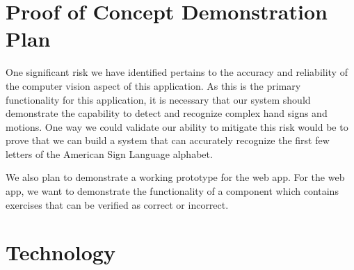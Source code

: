\documentclass{article}
\begin{document}
\section{Proof of Concept Demonstration Plan}

One significant risk we have identified pertains to the accuracy and reliability of the computer vision aspect of this application. As this is the primary functionality for this application, it is necessary that our system should demonstrate the capability to detect and recognize complex hand signs and motions. One way we could validate our ability to mitigate this risk would be to prove that we can build a system that can accurately recognize the first few letters of the American Sign Language alphabet.


We also plan to demonstrate a working prototype for the web app. For the web app, we want to demonstrate the functionality of a component which contains exercises that can be verified as correct or incorrect. 

\section{Technology}
\end{document}
